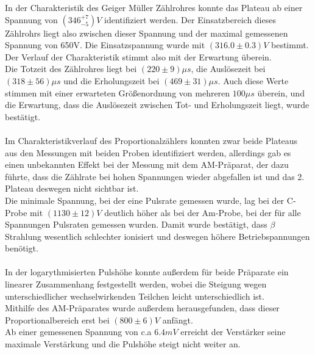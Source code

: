 \documentclass[12pt,a4paper]{article}
\begin{document}
In der Charakteristik des Geiger Müller Zählrohres konnte das Plateau ab einer Spannung von $(346_{-5}^{+7})\si{V}$ identifiziert werden. Der Einsatzbereich dieses Zählrohrs liegt also zwischen dieser Spannung und der maximal gemessenen Spannung von 650V. Die Einsatzspannung wurde mit $(316.0\pm 0.3) \si{V}$ bestimmt.\\
Der Verlauf der Charakteristik stimmt also mit der Erwartung überein.
\\
Die Totzeit des Zählrohres liegt bei $(220\pm 9) \mu s$, die Auslösezeit bei $(318\pm 56)\mu s$ und die Erholungszeit bei $(469\pm 31)\mu s$. Auch diese Werte stimmen mit einer erwarteten Größenordnung von mehreren $100\mu s$ überein, und die Erwartung, dass die Auslösezeit zwischen Tot- und Erholungszeit liegt, wurde bestätigt.\\
\\
Im Charakteristikverlauf des Proportionalzählers konnten zwar beide Plateaus aus den Messungen mit beiden Proben identifiziert werden, allerdings gab es einen unbekannten Effekt bei der Messung mit dem AM-Präparat, der dazu führte, dass die Zählrate bei hohen Spannungen wieder abgefallen ist und das 2. Plateau deswegen nicht sichtbar ist.\\
Die minimale Spannung, bei der eine Pulsrate gemessen wurde, lag bei der C-Probe mit $(1130\pm 12)V$ deutlich höher als bei der Am-Probe, bei der für alle Spannungen Pulsraten gemessen wurden. Damit wurde bestätigt, dass $\beta$ Strahlung wesentlich schlechter ionisiert und deswegen höhere Betriebspannungen benötigt.\\
\\
In der logarythmisierten Pulshöhe konnte außerdem für beide Präparate ein linearer Zusammenhang festgestellt werden, wobei die Steigung wegen unterschiedlicher wechselwirkenden Teilchen leicht unterschiedlich ist.\\
Mithilfe des AM-Präparates wurde außerdem herausgefunden, dass dieser Proportionalbereich erst bei $(800\pm 6) V$ anfängt.\\
Ab einer gemessenen Spannung von c.a $6.4 mV$ erreicht der Verstärker seine maximale Verstärkung und die Pulshöhe steigt nicht weiter an.






	
\end{document}
